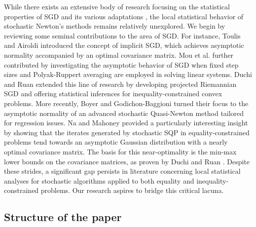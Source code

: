 \documentclass[aos]{imsart}
\numberwithin{equation}{section}
\theoremstyle{plain}
\begin{document}
While there exists an extensive body of research focusing on the statistical properties of SGD and its various adaptations \cite{polyak1992acceleration, chen2020statistical}, the local statistical behavior of stochastic Newton's methods remains relatively unexplored. 
We begin by reviewing some seminal contributions to the area of SGD. For instance, Toulis and Airoldi \cite{toulis2017asymptotic} introduced the concept of implicit SGD, which achieves asymptotic normality accompanied by an optimal covariance matrix. Mou et al. \cite{mou2020linear} further contributed by investigating the asymptotic behavior of SGD when fixed step sizes and Polyak-Ruppert averaging are employed in solving linear systems.
Duchi and Ruan \cite{duchi2021asymptotic} extended this line of research by developing projected Riemannian SGD and offering statistical inferences for inequality-constrained convex problems.
More recently, Boyer and Godichon-Baggioni \cite{boyer2023asymptotic} turned their focus to the asymptotic normality of an advanced stochastic Quasi-Newton method tailored for regression issues.
Na and Mahoney \cite{na2022asymptotic} provided a particularly interesting insight by showing that the iterates generated by stochastic SQP in equality-constrained problems tend towards an asymptotic Gaussian distribution with a nearly optimal covariance matrix.
The basis for this near-optimality is the min-max lower bounds on the covariance matrices, as proven by Duchi and Ruan \cite{duchi2021asymptotic}. 
Despite these strides, a significant gap persists in literature concerning local statistical analyses for stochastic algorithms applied to both equality and inequality-constrained problems. Our research aspires to bridge this critical lacuna.


\subsection{Structure of the paper}
\end{document}
